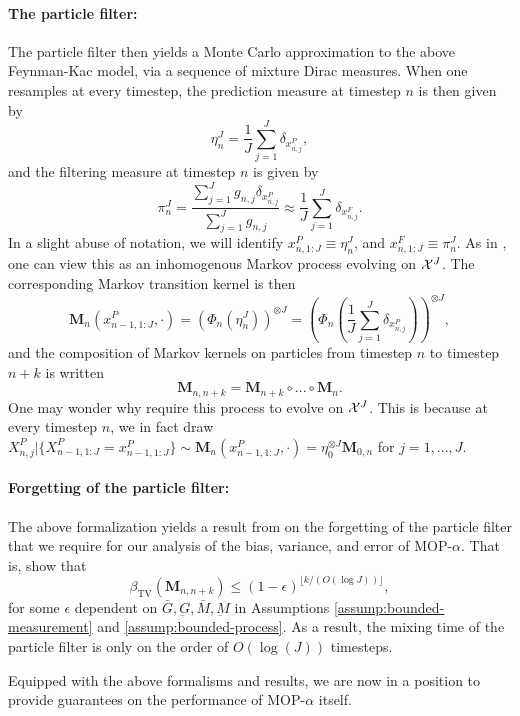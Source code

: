 \paragraph{The particle filter:} The particle filter then yields a Monte Carlo approximation to the above Feynman-Kac model, via a sequence of mixture Dirac measures. When one resamples at every timestep, the prediction measure at timestep $n$ is then given by 
\begin{equation}
\eta_n^J = \frac{1}{J}\sum_{j=1}^J \delta_{x_{n,j}^P},
\end{equation}
and the filtering measure at timestep $n$ is given by
\begin{equation}
\pi_n^J = \frac{\sum_{j=1}^J g_{n,j} \delta_{x_{n,j}^P}}{\sum_{j=1}^J g_{n,j}} \approx \frac{1}{J} \sum_{j=1}^J \delta_{x_{n,j}^F}.
\end{equation}
In a slight abuse of notation, we will identify $x_{n, 1:J}^P \equiv \eta_n^J$, and $x_{n, 1:J}^F \equiv \pi_n^J$. 
As in \cite{karjalainen23}, one can view this as an inhomogenous Markov process evolving on ${\mathcal{X}}^{J}$. The corresponding Markov transition kernel is then 
\begin{equation}
\textbf{M}_n(x_{n-1, 1:J}^P, \cdot) = \left(\Phi_{n}\left(\eta_n^J\right)\right)^{\otimes J} = \left(\Phi_{n}\left(\frac{1}{J}\sum_{j=1}^J \delta_{x_{n,j}^P}\right)\right)^{\otimes J},
\end{equation}
and the composition of Markov kernels on particles from timestep $n$ to timestep $n+k$ is written 
\begin{equation}
\textbf{M}_{n, n+k} = \textbf{M}_{n+k}\circ ...\circ \textbf{M}_n.
\end{equation}
One may wonder why \cite{karjalainen23} require this process to evolve on ${\mathcal{X}}^{J}$. This is because at every timestep $n$, we in fact draw $X_{n, j}^P | \{X_{n-1, 1:J}^P = x_{n-1, 1:J}^P\} \sim \textbf{M}_n(x_{n-1, 1:J}^P, \cdot) = \eta_0^{\otimes J} \textbf{M}_{0,n}$ for $j=1,...,J$. 

\paragraph{Forgetting of the particle filter:} 
The above formalization yields a result from \cite{karjalainen23} on the forgetting of the particle filter that we require for our analysis of the bias, variance, and error of MOP-$\alpha$.  
That is, \cite{karjalainen23} show that
\begin{equation}
\beta_{\mathrm{TV}}\left(\mathbf{M}_{n, n+k}\right) \leq(1-\epsilon)^{\lfloor k /(O(\log J))\rfloor},
\end{equation}
for some $\epsilon$ dependent on $\bar{G}, \underbar{G}, \bar{M}, \underbar{M}$ in Assumptions \ref{assump:bounded-measurement} and \ref{assump:bounded-process}. As a result, the mixing time of the particle filter is only on the order of $O(\log(J))$ timesteps. 


\vspace{3mm}

Equipped with the above formalisms and results, we are now in a position to provide guarantees on the performance of MOP-$\alpha$ itself. 